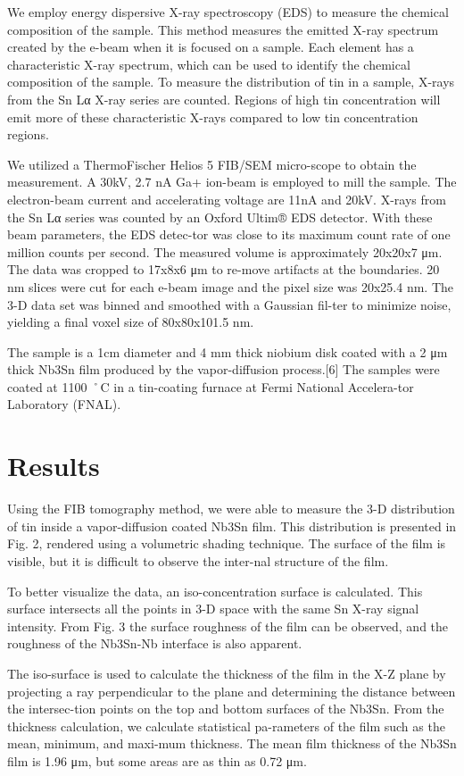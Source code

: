 We employ energy dispersive X-ray spectroscopy (EDS) to measure the chemical composition of the sample. This method measures the emitted X-ray spectrum created by the e-beam when it is focused on a sample. Each element has a characteristic X-ray spectrum, which can be used to identify the chemical composition of the sample. To measure the distribution of tin in a sample, X-rays from the Sn Lα X-ray series are counted. Regions of high tin concentration will emit more of these characteristic X-rays compared to low tin concentration regions.

We utilized a ThermoFischer Helios 5 FIB/SEM micro-scope to obtain the measurement. A 30kV, 2.7 nA Ga+ ion-beam is employed to mill the sample. The electron-beam current and accelerating voltage are 11nA and 20kV. X-rays from the Sn Lα series was counted by an Oxford Ultim® EDS detector. With these beam parameters, the EDS detec-tor was close to its maximum count rate of one million counts per second. The measured volume is approximately 20x20x7 μm. The data was cropped to 17x8x6 μm to re-move artifacts at the boundaries.  20 nm slices were cut for each e-beam image and the pixel size was 20x25.4 nm. The 3-D data set was binned and smoothed with a Gaussian fil-ter to minimize noise, yielding a final voxel size of 80x80x101.5 nm.

The sample is a 1cm diameter and 4 mm thick niobium disk coated with a 2 μm thick Nb3Sn film produced by the vapor-diffusion process.[6] The samples were coated at 1100 ˚C in a tin-coating furnace at Fermi National Accelera-tor Laboratory (FNAL). 

\section{Results}

Using the FIB tomography method, we were able to measure the 3-D distribution of tin inside a vapor-diffusion coated Nb3Sn film. This distribution is presented in Fig. 2, rendered using a volumetric shading technique. The surface of the film is visible, but it is difficult to observe the inter-nal structure of the film.
 
To better visualize the data, an iso-concentration surface is calculated. This surface intersects all the points in 3-D space with the same Sn X-ray signal intensity. From Fig. 3 the surface roughness of the film can be observed, and the roughness of the Nb3Sn-Nb interface is also apparent.
 
The iso-surface is used to calculate the thickness of the film in the X-Z plane by projecting a ray perpendicular to the plane and determining the distance between the intersec-tion points on the top and bottom surfaces of the Nb3Sn. From the thickness calculation, we calculate statistical pa-rameters of the film such as the mean, minimum, and maxi-mum thickness. The mean film thickness of the Nb3Sn film is 1.96 μm, but some areas are as thin as 0.72 μm.
 
